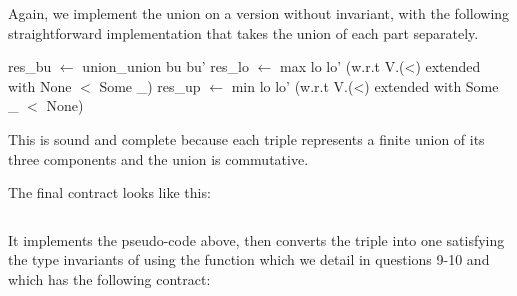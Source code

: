 Again, we implement the union on a version without invariant, with the following
straightforward implementation that takes the union of each part separately.
%
  \begin{algorithmic}
     \State res\_bu $\gets$ union\_union bu bu'
     \State res\_lo $\gets$ max lo lo'  (w.r.t V.(<) extended with None $<$ Some \_)
     \State res\_up $\gets$ min lo lo' (w.r.t V.(<) extended with Some \_ $<$ None)
  \end{algorithmic}
%
This is sound and complete because each triple represents a finite union of its three
components and the union is commutative.

The final contract looks like this:
\inputminted{\whyml}{why3code/union_contract.mlw}
It implements the pseudo-code above, then converts the triple into one satisfying the
type invariants of  using the function  which we
detail in questions 9-10 and which has the following contract:
\inputminted{\whyml}{why3code/fix_untyped_contract.mlw}
